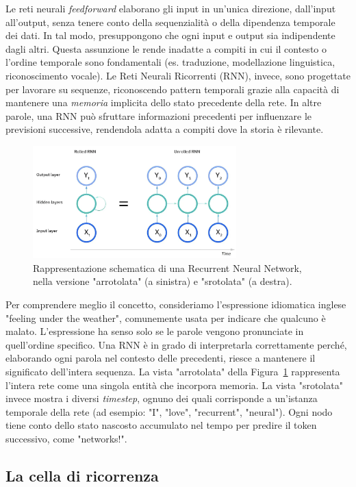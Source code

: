 Le reti neurali \textit{feedforward} elaborano gli input in un'unica direzione, dall'input all'output, senza tenere conto della sequenzialità o della dipendenza temporale dei dati. In tal modo, presuppongono che ogni input e output sia indipendente dagli altri. Questa assunzione le rende inadatte a compiti in cui il contesto o l'ordine temporale sono fondamentali (es. traduzione, modellazione linguistica, riconoscimento vocale). Le Reti Neurali Ricorrenti (RNN), invece, sono progettate per lavorare su sequenze, riconoscendo pattern temporali grazie alla capacità di mantenere una \textit{memoria} implicita dello stato precedente della rete. In altre parole, una RNN può sfruttare informazioni precedenti per influenzare le previsioni successive, rendendola adatta a compiti dove la storia è rilevante.
\begin{figure}
\centering
\includegraphics[width=0.70\textwidth]{figure/RNNRoll.png}
\caption{Rappresentazione schematica di una Recurrent Neural Network, nella versione "arrotolata" (a sinistra) e "srotolata" (a destra).}
\label{fig:rolledRNN}
\end{figure}
Per comprendere meglio il concetto, consideriamo l'espressione idiomatica inglese "feeling under the weather", comunemente usata per indicare che qualcuno è malato. L'espressione ha senso solo se le parole vengono pronunciate in quell'ordine specifico. Una RNN è in grado di interpretarla correttamente perché, elaborando ogni parola nel contesto delle precedenti, riesce a mantenere il significato dell'intera sequenza. La vista "arrotolata" della Figura~\ref{fig:rolledRNN} rappresenta l'intera rete come una singola entità che incorpora memoria. La vista "srotolata" invece mostra i diversi \textit{timestep}, ognuno dei quali corrisponde a un'istanza temporale della rete (ad esempio: "I", "love", "recurrent", "neural"). Ogni nodo tiene conto dello stato nascosto accumulato nel tempo per predire il token successivo, come "networks!".

\subsection{La cella di ricorrenza}

